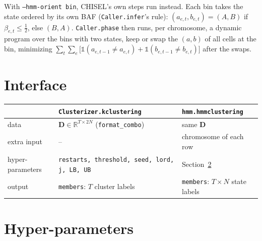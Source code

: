\documentclass[11pt]{article}
\newcommand{\code}[1]{\texttt{#1}}
\begin{document}
With \code{--hmm-orient bin}, CHISEL's own steps run instead. Each bin takes the state ordered by
its own BAF (\code{Caller.infer}'s rule): $(a_{e,t}, b_{e,t}) = (A, B)$ if
$\beta_{e,t} \le \tfrac12$, else $(B, A)$. \code{Caller.phase} then runs, per chromosome, a
dynamic program over the bins with two states, keep or swap the $(a, b)$ of all cells at the bin,
minimizing
$\sum_t \sum_e \bigl[\mathbb{1}(a_{e,t-1} \ne a_{e,t}) + \mathbb{1}(b_{e,t-1} \ne b_{e,t})\bigr]$
after the swaps.

\section{Interface}\label{sec:interface}

\begin{center}
\begin{tabular}{@{}lll@{}}
\toprule
 & \code{Clusterizer.kclustering} & \code{hmm.hmmclustering} \\
\midrule
data & $\mathbf{D} \in \mathbb{R}^{T \times 2N}$ (\code{format\_combo}) & same $\mathbf{D}$ \\
extra input & -- & chromosome of each row \\
hyper-parameters & \code{restarts, threshold, seed, lord, j, LB, UB} & Section~\ref{sec:params} \\
output & \code{members}: $T$ cluster labels & \code{members}: $T \times N$ state labels \\
\bottomrule
\end{tabular}
\end{center}

\section{Hyper-parameters}\label{sec:params}
\end{document}
